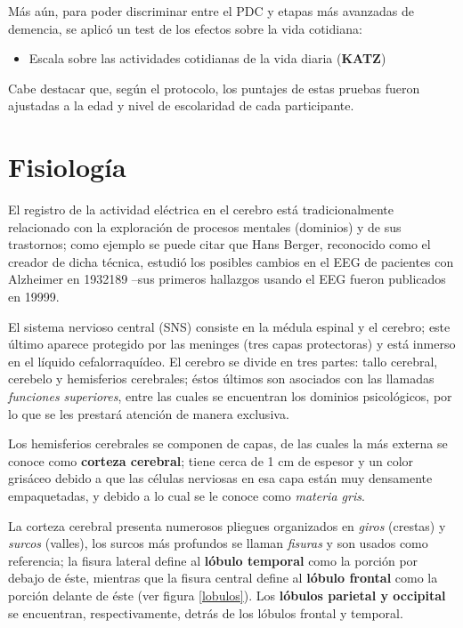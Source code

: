 Más aún, para poder discriminar entre el PDC y etapas más avanzadas de demencia, se aplicó un
test de los efectos sobre la vida cotidiana:
%
\begin{itemize}
\item {Escala sobre las actividades cotidianas de la vida diaria (\textbf{KATZ})} \cite{Roumec14}
\end{itemize}

Cabe destacar que, según el protocolo, los puntajes de estas pruebas fueron ajustadas a la edad y 
nivel de escolaridad de cada participante.


\section{Fisiología}

El registro de la actividad eléctrica en el 
cerebro
está tradicionalmente relacionado con la exploración de procesos mentales (dominios) y de sus 
trastornos; como ejemplo se puede citar que Hans Berger, reconocido como el creador de dicha
técnica, estudió los posibles cambios en el EEG de pacientes con Alzheimer en 1932189
--sus primeros hallazgos usando el EEG fueron publicados en 19999.

El sistema nervioso central (SNS) consiste en la médula espinal y el cerebro; 
este último aparece protegido por las meninges (tres capas protectoras) y está inmerso en el 
líquido cefalorraquídeo.
El cerebro se divide en tres partes: tallo cerebral, cerebelo y hemisferios cerebrales; éstos 
últimos son asociados con las llamadas \textit{funciones superiores},
entre las cuales se encuentran los dominios psicológicos,
por lo que se les prestará atención de manera exclusiva.

Los hemisferios cerebrales se componen de capas, de las cuales la más externa se conoce como
\textbf{corteza cerebral}; tiene cerca de 1 cm de espesor y un color grisáceo debido a que las 
células nerviosas en esa capa están muy densamente empaquetadas, y debido a lo cual se le conoce
como \textit{materia gris}.

La corteza cerebral presenta numerosos pliegues organizados en \textit{giros} (crestas) y
\textit{surcos} (valles), los surcos más profundos se llaman \textit{fisuras} y son usados como 
referencia; la fisura lateral define al \textbf{lóbulo temporal} como la porción por debajo de 
éste, mientras que la fisura central define al \textbf{lóbulo frontal} como la porción delante de 
éste (ver figura \ref{lobulos}). Los \textbf{lóbulos parietal y occipital} se encuentran, 
respectivamente, detrás de los lóbulos frontal y temporal.

